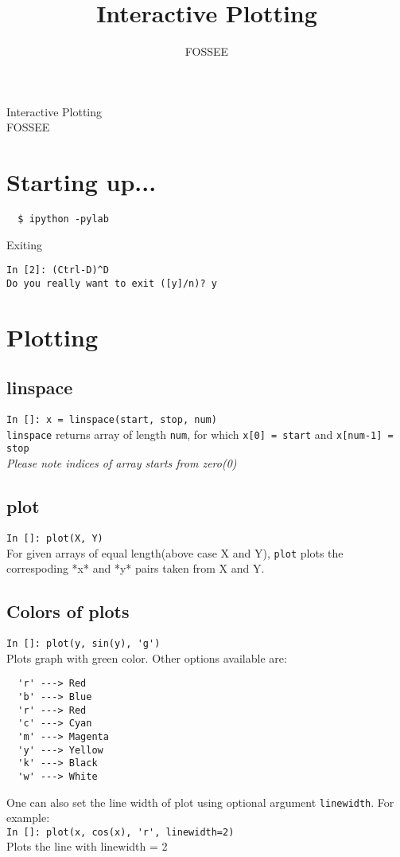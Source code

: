 \documentclass[12pt]{article}
\title{Interactive Plotting}
\author{FOSSEE}
\newcommand{\typ}[1]{\lstinline{#1}}
\begin{document}
\date{}
\vspace{-1in}
\begin{center}
\LARGE{Interactive Plotting}\\
\large{FOSSEE}
\end{center}
\section{Starting up...}

\begin{lstlisting}
  $ ipython -pylab  
\end{lstlisting}
Exiting 
\begin{lstlisting}     
In [2]: (Ctrl-D)^D
Do you really want to exit ([y]/n)? y
\end{lstlisting} %

\section{Plotting}
\subsection{linspace}
\typ{In []: x = linspace(start, stop, num)}\\
\typ{linspace} returns array of length \typ{num}, for which \typ{x[0] = start} and \typ{x[num-1] = stop} \\
\emph{Please note indices of array starts from zero(0)}

\subsection{plot}
\typ{In []: plot(X, Y)}\\
For given arrays of equal length(above case X and Y), \typ{plot} plots the correspoding *x* and *y* pairs taken from X and Y.

\subsection{Colors of plots}
\typ{In []: plot(y, sin(y), 'g')}\\
Plots graph with green color. Other options available are:
\begin{lstlisting}
  'r' ---> Red
  'b' ---> Blue
  'r' ---> Red 
  'c' ---> Cyan 
  'm' ---> Magenta
  'y' ---> Yellow
  'k' ---> Black 
  'w' ---> White
\end{lstlisting}
One can also set the line width of plot using optional argument \typ{linewidth}. For example:\\
\typ{In []: plot(x, cos(x), 'r', linewidth=2)}\\
Plots the line with linewidth = 2
\end{document}
